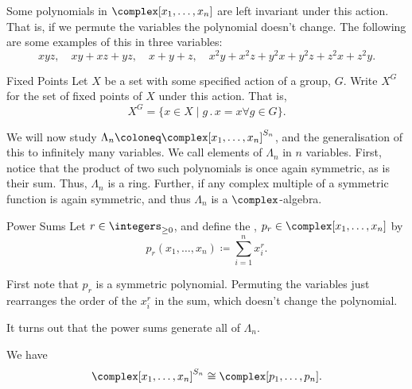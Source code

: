\documentclass[fleqn]{NotesClass}
\newcommand{\action}{\mathbin{.}}
\newcommand{\isomorphic}{\cong}
\begin{document}
    Some polynomials in \(\complex[x_1, \dotsc, x_n]\) are left invariant under this action.
    That is, if we permute the variables the polynomial doesn't change.
    The following are some examples of this in three variables:
    \begin{equation}
        \label{eqn:example symmetric polynomials}
        xyz, \quad xy + xz + yz, \quad x + y + z, \quad x^2y + x^2z + y^2x + y^2z + z^2x + z^2y.
    \end{equation}
    
    \begin{ntn}{Fixed Points}{}
        Let \(X\) be a set with some specified action of a group, \(G\).
        Write \(X^G\) for the set of fixed points of \(X\) under this action.
        That is,
        \begin{equation}
            X^G = \{x \in X \mid g \action x = x \forall g \in G\}.
        \end{equation}
    \end{ntn}
    
    We will now study \(\Lambda_n \coloneq \complex[x_1, \dotsc, x_n]^{S_n}\), and the generalisation of this to infinitely many variables.
    We call elements of \(\Lambda_n\)  in \(n\) variables.
    First, notice that the product of two such polynomials is once again symmetric, as is their sum.
    Thus, \(\Lambda_n\) is a ring.
    Further, if any complex multiple of a symmetric function is again symmetric, and thus \(\Lambda_n\) is a \(\complex\)-algebra.
    
    \begin{dfn}{Power Sums}{}
        Let \(r \in \integers_{\ge 0}\), and define the , \(p_r \in \complex[x_1, \dotsc, x_n]\) by
        \begin{equation}
            p_r(x_1, \dotsc, x_n) \coloneq \sum_{i=1}^n x_i^r.
        \end{equation}
    \end{dfn}
    
    First note that \(p_r\) is a symmetric polynomial.
    Permuting the variables just rearranges the order of the \(x_i^r\) in the sum, which doesn't change the polynomial.
    
    It turns out that the power sums generate all of \(\Lambda_n\).
    
    \begin{prp}{}{}
        We have
        \begin{equation}
            \complex[x_1, \dotsc, x_n]^{S_n} \isomorphic \complex[p_1, \dotsc, p_n].
        \end{equation}
    \end{prp}
    
\end{document}
